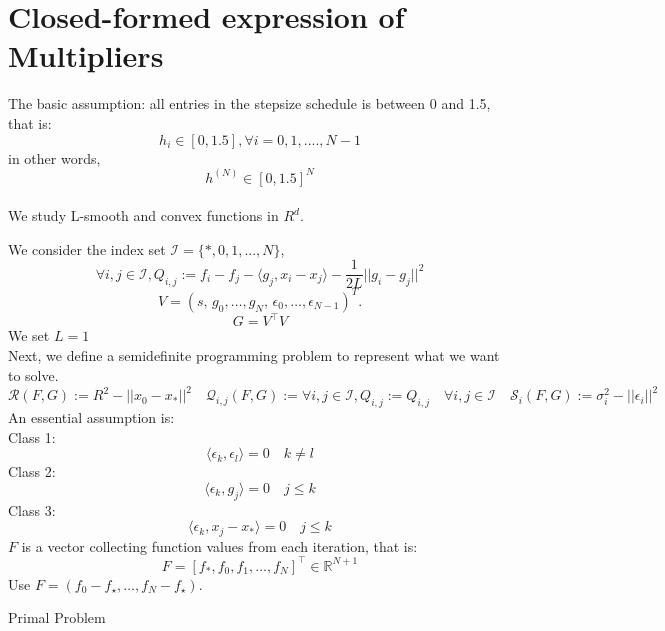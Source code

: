 


\section{Closed-formed expression of Multipliers}
The basic assumption: all entries in the stepsize schedule is between 0 and 1.5, that is:
\[h_i\in [0,1.5], \forall i = 0, 1, ....,N-1\] in other words, \[h^{(N)} \in [0, 1.5]^N\]\\
We study L-smooth and convex functions in $R^d$.








We consider the index set $\mathcal{I}=\{*,0,1,...,N\}$,
\[\forall i,j\in \mathcal{I}, Q_{i,j}:=f_i-f_j-\langle g_j,x_i-x_j\rangle -\frac{1}{2L}||g_i-g_j||^2\]
\[
V=
\left(
s,\,
g_0,\ldots,g_N,\,
\epsilon_0,\ldots,\epsilon_{N-1}
\right)^{T}.
\]
\[G=V^{\top}V\]
We set $L=1$\\
Next, we define a semidefinite programming problem to represent what we want to solve.
$\mathcal{R}(F,G):=R^2-||x_0-x_*||^2\quad \mathcal{Q}_{i,j}(F,G):= \forall i,j\in \mathcal{I}, Q_{i,j}:=Q_{i,j} \quad \forall i,j\in \mathcal{I}\quad \mathcal{S}_i(F,G):=\sigma_i^2-||\epsilon_i||^2 \quad $\\
An essential assumption is:\\
Class 1: \[\langle\epsilon_k, \epsilon_l \rangle = 0 \quad k \neq l\]
Class 2: \[\langle \epsilon_k, g_j\rangle = 0 \quad j\le k\]
Class 3: \[\langle \epsilon_k, x_j-x_* \rangle = 0 \quad j\le k\]
$F$ is a vector collecting function values from each iteration, that is:
\[F=[f_*, f_0,f_1, \ldots, f_N]^{\top} \in \mathbb{R}^{N+1}\]
{\color{red} Use $F=(f_0-f_\star, \dots, f_N-f_\star)$.}

Primal Problem\\

